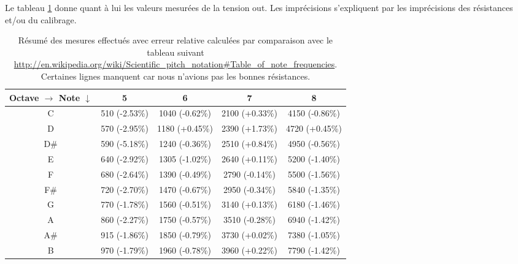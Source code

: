Le tableau \ref{tab:keyboard-measure-vs-theory} donne quant
à lui les valeurs mesurées de la tension out. Les imprécisions
s'expliquent par les imprécisions des résistances et/ou du
calibrage.

\begin{table}[ht]
	\centering
		\begin{tabular}{|c|c|c|c|c|}
			\hline
				\specialcell{Octave $\rightarrow$ \\ Note $\downarrow$} & 5 & 6 & 7 & 8 \\
			\hline
				 C & \unit{510}{\milli\volt} (-2.53\%) & \unit{1040}{\milli\volt} (-0.62\%) & \unit{2100}{\milli\volt} (+0.33\%) & \unit{4150}{\milli\volt} (-0.86\%) \\
			\hline
				 D &  \unit{570}{\milli\volt} (-2.95\%) & \unit{1180}{\milli\volt} (+0.45\%) & \unit{2390}{\milli\volt} (+1.73\%) & \unit{4720}{\milli\volt} (+0.45\%) \\
			\hline
				 D\# & \unit{590}{\milli\volt} (-5.18\%) & \unit{1240}{\milli\volt} (-0.36\%) & \unit{2510}{\milli\volt} (+0.84\%) & \unit{4950}{\milli\volt} (-0.56\%) \\
			\hline
				 E & \unit{640}{\milli\volt} (-2.92\%) & \unit{1305}{\milli\volt} (-1.02\%) & \unit{2640}{\milli\volt} (+0.11\%) & \unit{5200}{\milli\volt} (-1.40\%) \\
			\hline
				 F & \unit{680}{\milli\volt} (-2.64\%) & \unit{1390}{\milli\volt} (-0.49\%) & \unit{2790}{\milli\volt} (-0.14\%) & \unit{5500}{\milli\volt} (-1.56\%) \\
			\hline
				 F\# & \unit{720}{\milli\volt} (-2.70\%) & \unit{1470}{\milli\volt} (-0.67\%) & \unit{2950}{\milli\volt} (-0.34\%) & \unit{5840}{\milli\volt} (-1.35\%) \\
			\hline
				 G & \unit{770}{\milli\volt} (-1.78\%) & \unit{1560}{\milli\volt} (-0.51\%) & \unit{3140}{\milli\volt} (+0.13\%) & \unit{6180}{\milli\volt} (-1.46\%) \\
			\hline
				 A & \unit{860}{\milli\volt} (-2.27\%) & \unit{1750}{\milli\volt} (-0.57\%) & \unit{3510}{\milli\volt} (-0.28\%) & \unit{6940}{\milli\volt} (-1.42\%) \\
			\hline
				 A\# & \unit{915}{\milli\volt} (-1.86\%) & \unit{1850}{\milli\volt} (-0.79\%) & \unit{3730}{\milli\volt} (+0.02\%) & \unit{7380}{\milli\volt} (-1.05\%) \\
			\hline
				 B & \unit{970}{\milli\volt} (-1.79\%) & \unit{1960}{\milli\volt} (-0.78\%) & \unit{3960}{\milli\volt} (+0.22\%) & \unit{7790}{\milli\volt} (-1.42\%) \\
			\hline
		\end{tabular}
	\caption{Résumé des mesures effectués avec erreur relative calculées par comparaison avec
	le tableau suivant \url{http://en.wikipedia.org/wiki/Scientific_pitch_notation\#Table_of_note_frequencies}. 
	Certaines lignes manquent car nous n'avions pas les bonnes résistances.}
	\label{tab:keyboard-measure-vs-theory}
\end{table}

